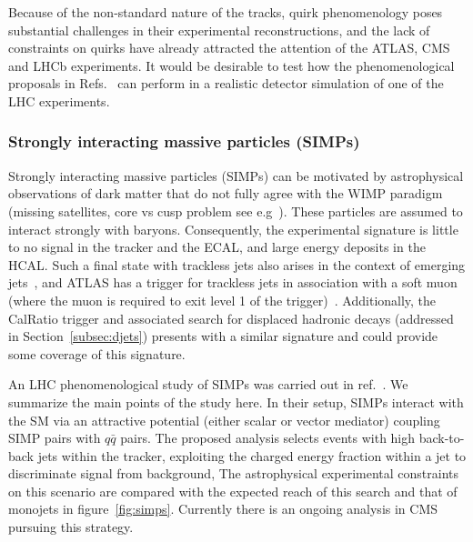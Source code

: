 Because of the non-standard nature of the tracks, quirk phenomenology poses substantial challenges in their experimental reconstructions, and the lack of constraints on quirks have already attracted the attention of the ATLAS, CMS and LHCb experiments. It would be desirable to test how the phenomenological proposals in Refs.~\cite{Farina:2017cts,Knapen:2017kly} can perform in a realistic detector simulation of one of the LHC experiments.

\subsubsection{Strongly interacting massive particles (SIMPs)}

Strongly interacting massive particles (SIMPs) can be motivated by astrophysical observations of dark matter that do not fully agree with the WIMP paradigm (missing satellites, core vs cusp problem see e.g~\cite{2010arXiv1009.4505B,2011MNRAS.415L..40B,Weinberg:2013aya,1742-6596-437-1-012001}). These particles are assumed to interact strongly with baryons. Consequently, the experimental signature is little to no signal in the tracker and the ECAL, and large energy deposits in the HCAL. Such a final state with trackless jets also arises in the context of emerging jets~\cite{Schwaller:2015gea}, and ATLAS has a trigger for trackless jets in association with a soft muon (where the muon is required to exit level 1 of the trigger)~\cite{ATLASLLPTriggers}. Additionally, the CalRatio trigger and associated search for displaced hadronic decays (addressed in Section~\ref{subsec:djets}) presents with a similar signature and could provide some coverage of this signature.

An LHC phenomenological study of SIMPs was carried out in ref.~\cite{Daci:2015hca}. We summarize the main points of the study here. In their setup, SIMPs interact with the SM via an attractive potential (either scalar or vector mediator) coupling SIMP pairs with $q\bar{q}$ pairs. The proposed analysis selects events with high \pT back-to-back jets within the tracker, exploiting the charged energy fraction within a jet to discriminate signal from background,  The astrophysical experimental constraints on this scenario are compared with the expected reach of this search and that of monojets in figure~\ref{fig:simps}. Currently there is an ongoing analysis in CMS pursuing this strategy.

